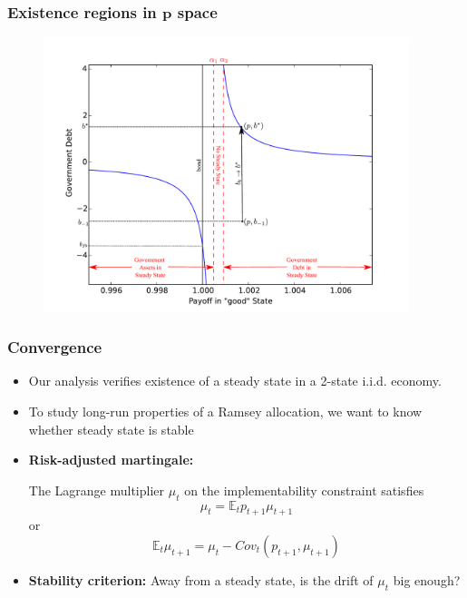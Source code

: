 \documentclass{beamer}
\newcommand{\EE}{\mathbb E}
\begin{document}
\begin{frame}
   \frametitle{Existence regions in $\bm{p}$ space}
	\begin{figure}
		\begin{center}
		\includegraphics[width=4.2in]{Images/graph_nostable.pdf}
	\end{center}	
	\end{figure}

  \end{frame}


 \begin{frame}
  \frametitle{Convergence}
  \begin{itemize}
		\item Our analysis verifies existence of a steady state in a 2-state i.i.d. economy.
		\item To study long-run properties of a Ramsey allocation, we want to know whether steady state is stable
		\item \textbf{Risk-adjusted martingale:}
		
		The Lagrange multiplier $\mu_t$ on the implementability  constraint   satisfies
		\[
			\mu_t = \EE_t p_{t+1} \mu_{t+1}
		\] or
		\[
		\EE_t  \mu_{t+1}	= \mu_t -Cov_t (p_{t+1}, \mu_{t+1})
		\]
	
		\item \textbf{Stability criterion: }   Away from a steady state, is the drift  of $\mu_t$ big enough?
		\end{itemize}
	

  \end{frame}
\end{document}
